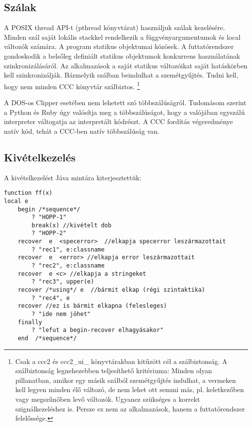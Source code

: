 \label{THREADS}
\subsection{Szálak}

A POSIX thread API-t (pthread könyvtárat) használjuk szálak kezelésére. 
Minden szál saját lokális stackkel rendelkezik a függvényargumentumok
és local változók számára. A program statikus objektumai  közösek.
A futtatórendszer gondoskodik a belsőleg definiált statikus objektumok
konkurrens használatának szinkronizálásáról. Az alkalmazások a saját
statikus változóikat saját hatáskörben kell szinkronizálják.
Bármelyik szálban beindulhat a szemétgyűjtés. Tudni kell, hogy 
nem minden CCC könyvtár szálbiztos.%
\footnote{Csak a ccc2 és ccc2\_ui\_  könyvtárakban kitűzött cél
a szálbiztonság. A szálbiztonság legnehezebben
teljesíthető kritériuma: Minden olyan pillanatban, amikor egy másik 
szálból szemétgyűjtés indulhat, a vermeken kell legyen minden 
élő változó, de nem lehet ott semmi más, pl. keletkezőben vagy megszűnőben 
levő változók. Ugyanez szükséges a korrekt szignálkezeléshez is.
Persze ez nem az alkalmazások, hanem a futtatórendszer 
felelőssége.}

A DOS-os Clipper esetében nem lehetett szó többszálúságról. 
Tudomásom szerint a Python és Ruby úgy valósítja meg a többszálúságot, 
hogy a valójában egyszálú interpreter váltogatja az interpretált kódrészt. 
A CCC fordítás végeredménye natív kód, tehát a CCC-ben natív többszálúság van.



\subsection{Kivételkezelés}

A kivételkezelést Jáva mintára kiterjesztettük:

\begin{verbatim}
function ff(x)
local e
    begin /*sequence*/
        ? "HOPP-1"
        break(x) //kivételt dob
        ? "HOPP-2"
    recover  e  <specerror>  //elkapja specerror leszármazottait
        ? "rec1", e:classname
    recover  e  <error> //elkapja error leszármazottait
        ? "rec2", e:classname
    recover  e <c> //elkapja a stringeket
        ? "rec3", upper(e)
    recover /*using*/ e  //bármit elkap (régi szintaktika)
        ? "rec4", e
    recover //ez is bármit elkapna (felesleges) 
        ? "ide nem jöhet"
    finally
        ? "lefut a begin-recover elhagyásakor"
    end  /*sequence*/
\end{verbatim}

